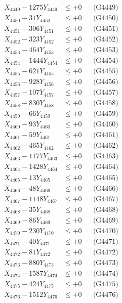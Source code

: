 \documentclass[a4paper,10pt]{article}
\begin{document}
{\begin{align}
X_{4449} - 1275Y_{4449} &\leq +0 && \text{(G4449)} \\
X_{4450} - 31Y_{4450} &\leq +0 && \text{(G4450)} \\
\allowbreak
X_{4451} - 306Y_{4451} &\leq +0 && \text{(G4451)} \\
X_{4452} - 323Y_{4452} &\leq +0 && \text{(G4452)} \\
X_{4453} - 464Y_{4453} &\leq +0 && \text{(G4453)} \\
X_{4454} - 1444Y_{4454} &\leq +0 && \text{(G4454)} \\
X_{4455} - 621Y_{4455} &\leq +0 && \text{(G4455)} \\
X_{4456} - 928Y_{4456} &\leq +0 && \text{(G4456)} \\
X_{4457} - 107Y_{4457} &\leq +0 && \text{(G4457)} \\
X_{4458} - 830Y_{4458} &\leq +0 && \text{(G4458)} \\
X_{4459} - 66Y_{4459} &\leq +0 && \text{(G4459)} \\
X_{4460} - 93Y_{4460} &\leq +0 && \text{(G4460)} \\
\allowbreak
X_{4461} - 59Y_{4461} &\leq +0 && \text{(G4461)} \\
X_{4462} - 465Y_{4462} &\leq +0 && \text{(G4462)} \\
X_{4463} - 1177Y_{4463} &\leq +0 && \text{(G4463)} \\
X_{4464} - 1428Y_{4464} &\leq +0 && \text{(G4464)} \\
X_{4465} - 13Y_{4465} &\leq +0 && \text{(G4465)} \\
X_{4466} - 48Y_{4466} &\leq +0 && \text{(G4466)} \\
X_{4467} - 1148Y_{4467} &\leq +0 && \text{(G4467)} \\
X_{4468} - 35Y_{4468} &\leq +0 && \text{(G4468)} \\
X_{4469} - 86Y_{4469} &\leq +0 && \text{(G4469)} \\
X_{4470} - 230Y_{4470} &\leq +0 && \text{(G4470)} \\
\allowbreak
X_{4471} - 40Y_{4471} &\leq +0 && \text{(G4471)} \\
X_{4472} - 81Y_{4472} &\leq +0 && \text{(G4472)} \\
X_{4473} - 880Y_{4473} &\leq +0 && \text{(G4473)} \\
X_{4474} - 1587Y_{4474} &\leq +0 && \text{(G4474)} \\
X_{4475} - 424Y_{4475} &\leq +0 && \text{(G4475)} \\
X_{4476} - 1512Y_{4476} &\leq +0 && \text{(G4476)} \\

\end{align}}
\end{document}
